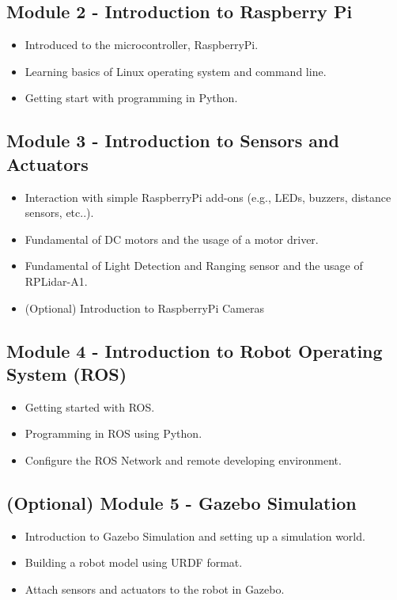 \documentclass[11pt,letterpaper]{article}
\begin{document}
\subsection*{Module 2 - Introduction to Raspberry Pi}
\begin{itemize}
    \item Introduced to the microcontroller, RaspberryPi.
    \item Learning basics of Linux operating system and command line.
    \item Getting start with programming in Python.
\end{itemize}

\subsection*{Module 3 - Introduction to Sensors and Actuators}
\begin{itemize}
    \item Interaction with simple RaspberryPi add-ons (e.g., LEDs, buzzers, distance sensors, etc..).
    \item Fundamental of DC motors and the usage of a motor driver.
    \item Fundamental of Light Detection and Ranging sensor and the usage of RPLidar-A1.
    \item (Optional) Introduction to RaspberryPi Cameras
\end{itemize}

\subsection*{Module 4 - Introduction to Robot Operating System (ROS)}
\begin{itemize}
    \item Getting started with ROS.
    \item Programming in ROS using Python.
    \item Configure the ROS Network and remote developing environment.
\end{itemize}

\subsection*{(Optional) Module 5 - Gazebo Simulation}
\begin{itemize}
    \item Introduction to Gazebo Simulation and setting up a simulation world.
    \item Building a robot model using URDF format.
    \item Attach sensors and actuators to the robot in Gazebo.
\end{itemize}
\end{document}
